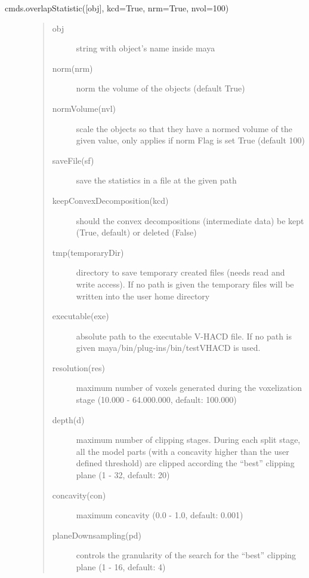 \documentclass[letterpaper,10pt,english]{sphinxmanual}
\begin{document}
 cmds.overlapStatistic({[}obj{]}, kcd=True, nrm=True, nvol=100)
\begin{description}
\item[{}] \leavevmode\begin{quote}\begin{description}
\item[{obj}] \leavevmode
string with object’s name inside maya

\item[{norm(nrm)}] \leavevmode
norm the volume of the objects (default True)

\item[{normVolume(nvl)}] \leavevmode
scale the objects so that they have a normed volume of the given value, only applies if norm Flag is set True (default 100)

\item[{saveFile(sf)}] \leavevmode
save the statistics in a file at the given path

\item[{keepConvexDecomposition(kcd)}] \leavevmode
should the convex decompositions (intermediate data) be kept (True, default) or deleted (False)

\item[{tmp(temporaryDir)}] \leavevmode
directory to save temporary created files (needs read and write access). If no path is given the temporary files will be written into the user home directory

\item[{executable(exe)}] \leavevmode
absolute path to the executable V-HACD file. If no path is given maya/bin/plug-ins/bin/testVHACD is used.

\item[{resolution(res)}] \leavevmode
maximum number of voxels generated during the voxelization stage (10.000 - 64.000.000, default: 100.000)

\item[{depth(d)}] \leavevmode
maximum number of clipping stages. During each split stage, all the model parts (with a concavity higher than the user defined threshold) are clipped according the “best” clipping plane (1 - 32, default: 20)

\item[{concavity(con)}] \leavevmode
maximum concavity (0.0 - 1.0, default: 0.001)

\item[{planeDownsampling(pd)}] \leavevmode
controls the granularity of the search for the “best” clipping plane (1 - 16, default: 4)


\end{description}
\end{quote}
\end{description}
\end{document}
